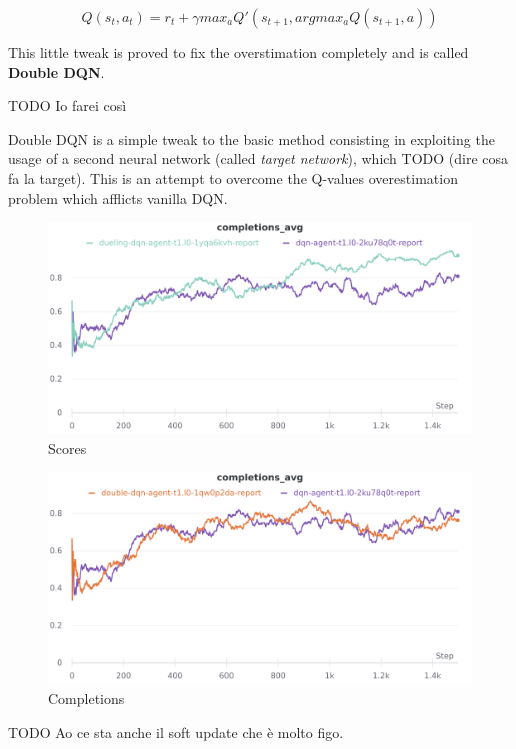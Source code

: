 \documentclass[12pt]{article}
\begin{document}
\[ Q(s_t,a_t)= r_t+\gamma max_a Q'(s_{t+1},argmax_a Q(s_{t+1},a))\]

This little tweak is proved to fix the overstimation completely and is called \textbf{Double DQN}.

TODO Io farei così

Double DQN \cite{double-dqn} is a simple tweak to the basic method consisting in exploiting the usage of a second neural network (called \textit{target network}), which TODO (dire cosa fa la target). This is an attempt to overcome the Q-values overestimation problem which afflicts vanilla DQN.


\begin{figure}[H]
        \centerline{\includegraphics[scale=.2]{res/charts/double_scores.png}}
        \caption{Scores}
\end{figure}

\begin{figure}[H]
        \centerline{\includegraphics[scale=.2]{res/charts/double_completions.png}}
        \caption{Completions}
\end{figure}

TODO Ao ce sta anche il soft update che è molto figo.
\end{document}
